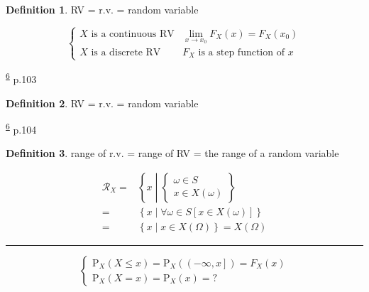 \documentclass[
]{book}
\theoremstyle{definition}
\newtheorem{definition}{Definition}[chapter]
\theoremstyle{definition}
\theoremstyle{definition}
\theoremstyle{definition}
\theoremstyle{remark}
\begin{document}
\begin{definition}
\protect\hypertarget{def:unnamed-chunk-7}{}\label{def:unnamed-chunk-7}RV = r.v. = random variable
\end{definition}

\[
\begin{cases}
X\text{ is a continuous RV} & \lim\limits _{x\rightarrow x_{{\scriptscriptstyle 0}}}F_{{\scriptscriptstyle X}}\left(x\right)=F_{{\scriptscriptstyle X}}\left(x_{{\scriptscriptstyle 0}}\right)\\
X\text{ is a discrete RV} & F_{{\scriptscriptstyle X}}\text{ is a step function of }x
\end{cases}
\]

\textsuperscript{\protect\hyperlink{ref-zhang2021}{6}} p.103

\begin{definition}
\protect\hypertarget{def:unnamed-chunk-8}{}\label{def:unnamed-chunk-8}RV = r.v. = random variable
\end{definition}

\textsuperscript{\protect\hyperlink{ref-zhang2021}{6}} p.104

\begin{definition}
\protect\hypertarget{def:unnamed-chunk-9}{}\label{def:unnamed-chunk-9}range of r.v. = range of RV = the range of a random variable
\end{definition}

\[
\begin{aligned}
\mathcal{R}_{{\scriptscriptstyle X}}=&\left\{ x\middle|\begin{cases}
\omega\in S\\
x\in X\left(\omega\right)
\end{cases}\right\} \\=&\left\{ x\middle|\forall\omega\in S\left[x\in X\left(\omega\right)\right]\right\} \\=&\left\{ x\middle|x\in X\left(\Omega\right)\right\} =X\left(\Omega\right)
\end{aligned}
\]

\begin{center}\rule{0.5\linewidth}{0.5pt}\end{center}

\[
\begin{cases}
\mathrm{P}_{{\scriptscriptstyle X}}\left(X\le x\right)=\mathrm{P}_{{\scriptscriptstyle X}}\left(\left(-\infty,x\right]\right)=F_{{\scriptscriptstyle X}}\left(x\right)\\
\mathrm{P}_{{\scriptscriptstyle X}}\left(X=x\right)=\mathrm{P}_{{\scriptscriptstyle X}}\left(x\right)=?
\end{cases}
\]
\end{document}
